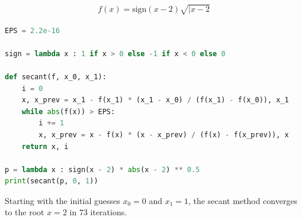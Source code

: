 \documentclass{article}
\begin{document}
\clearpage
\problem{}
\begin{align*}
    f(x) = \mathrm{sign}(x - 2)\sqrt{|x - 2}
\end{align*}
\begin{lstlisting}[language=Python]
EPS = 2.2e-16

sign = lambda x : 1 if x > 0 else -1 if x < 0 else 0

def secant(f, x_0, x_1):
    i = 0
    x, x_prev = x_1 - f(x_1) * (x_1 - x_0) / (f(x_1) - f(x_0)), x_1
    while abs(f(x)) > EPS:
        i += 1
        x, x_prev = x - f(x) * (x - x_prev) / (f(x) - f(x_prev)), x
    return x, i

p = lambda x : sign(x - 2) * abs(x - 2) ** 0.5
print(secant(p, 0, 1))
\end{lstlisting}
Starting with the initial guesses $x_0 = 0$ and $x_1 = 1$, the secant method converges to the root $x = 2$ in $73$ iterations.
\end{document}
